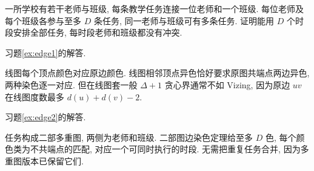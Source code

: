 \begin{exercise}\label{ex:edge2}
一所学校有若干老师与班级, 每条教学任务连接一位老师和一个班级. 每位老师及每个班级各参与至多 $D$ 条任务, 同一老师与班级可有多条任务. 证明能用 $D$ 个时段安排全部任务, 每时段老师和班级都没有冲突.
\end{exercise}
习题\ref{ex:edge1}的解答.
\begin{solution}
线图每个顶点颜色对应原边颜色. 线图相邻顶点异色恰好要求原图共端点两边异色, 两种染色逐一对应. 但在线图套一般 $\Delta+1$ 贪心界通常不如 Vizing, 因为原边 $uv$ 在线图度数最多 $d(u)+d(v)-2$.
\end{solution}
习题\ref{ex:edge2}的解答.
\begin{solution}
任务构成二部多重图, 两侧为老师和班级. 二部图边染色定理给至多 $D$ 色, 每个颜色类为不共端点的匹配, 对应一个可同时执行的时段. 无需把重复任务合并, 因为多重图版本已保留它们.
\end{solution}
